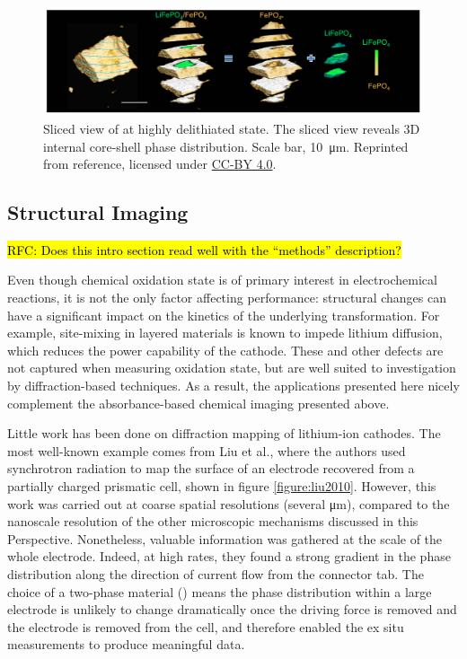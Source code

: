\documentclass[journal=cmatex,manuscript=perspective]{achemso}
\begin{document}
\begin{figure}
  \includegraphics[width=\textwidth]{wang2016.png}
  \caption{Sliced view of  at highly delithiated
    state. The sliced view reveals 3D internal core-shell phase
    distribution. Scale bar, \SI{10}{\micro\metre}. Reprinted from
    reference\cite{wang2016}, licensed under
    \href{https://creativecommons.org/licenses/by/4.0/}{CC-BY 4.0}.}
  \label{figure:wang2016}
\end{figure}


\subsection{Structural Imaging}

\hl{RFC: Does this intro section read well with the ``methods'' description?}

Even though chemical oxidation state is of primary interest in
electrochemical reactions, it is not the only factor affecting
performance: structural changes can have a significant impact on the
kinetics of the underlying transformation. For example, site-mixing in
layered materials is known to impede lithium diffusion\cite{xu2016-2},
which reduces the power capability of the cathode. These and other
defects are not captured when measuring oxidation state, but are well
suited to investigation by diffraction-based techniques. As a result,
the applications presented here nicely complement the absorbance-based
chemical imaging presented above.

Little work has been done on diffraction mapping of lithium-ion
cathodes. The most well-known example comes from Liu et
al.\cite{liu2010}, where the authors used synchrotron radiation to map
the surface of an electrode recovered from a partially charged
prismatic cell, shown in figure \ref{figure:liu2010}. However, this
work was carried out at coarse spatial resolutions (several
\si{\micro\meter}), compared to the nanoscale resolution of the other
microscopic mechanisms discussed in this Perspective. Nonetheless,
valuable information was gathered at the scale of the whole
electrode. Indeed, at high rates, they found a strong gradient in the
phase distribution along the direction of current flow from the
connector tab. The choice of a two-phase material () means
the phase distribution within a large electrode is unlikely to change
dramatically once the driving force is removed and the electrode is
removed from the cell, and therefore enabled the ex situ measurements
to produce meaningful data.
\end{document}
